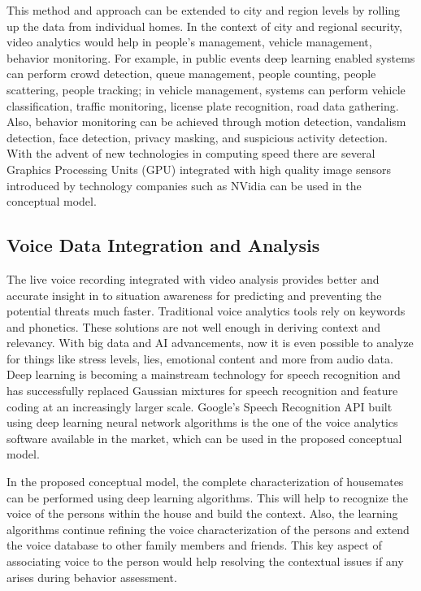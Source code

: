 \documentclass[sigconf]{acmart}
\begin{document}
This method and approach can be extended to city and region levels by rolling up the data from individual homes. In the context of city and regional security, video analytics would help in people's management, vehicle management, behavior monitoring. For example, in public events deep learning enabled systems can  perform crowd detection, queue management, people counting, people scattering, people tracking; in vehicle management, systems can perform vehicle classification, traffic monitoring, license plate recognition, road data gathering. Also, behavior monitoring can be achieved through motion detection, vandalism detection, face detection, privacy masking, and suspicious activity detection. With the advent of new technologies in computing speed there are several Graphics Processing Units (GPU) integrated with high quality image sensors  introduced by technology companies such as NVidia can be used in the conceptual model.

\subsection{Voice Data Integration and Analysis}
The live voice recording integrated with video analysis provides better and accurate insight in to situation awareness for predicting and preventing the potential threats much faster. Traditional voice analytics tools rely on keywords and phonetics. These solutions are not well enough in deriving context and relevancy. With big data and AI advancements, now it is even possible to analyze for things like stress levels, lies, emotional content and more from audio data. Deep learning is becoming a mainstream technology for speech recognition and has successfully replaced Gaussian mixtures for speech recognition and feature coding at an increasingly larger scale. Google's Speech Recognition API built using deep learning neural network algorithms is the one of the voice analytics software available in the market, which can be used in the proposed conceptual model.

In the proposed conceptual model, the complete characterization of housemates can be performed using deep learning algorithms. This will help to recognize the voice of the persons within the house and build the context. Also, the learning algorithms continue refining the voice characterization of the persons and extend the voice database to other family members and friends. This key aspect of associating voice to the person would help resolving the contextual issues if any arises during behavior assessment.
\end{document}
